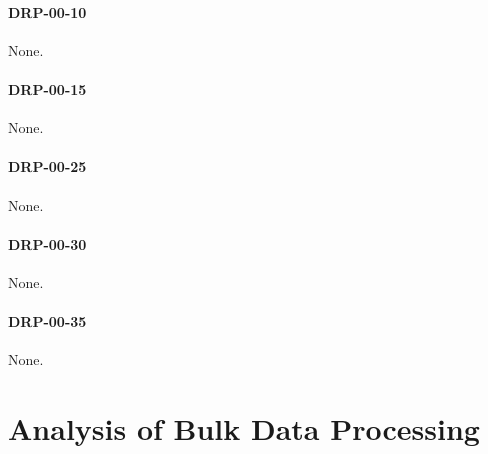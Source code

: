 \documentclass[DM,lsstdraft,STR,toc]{lsstdoc}
\begin{document}
\paragraph{DRP-00-10}

None.

\paragraph{DRP-00-15}

None.

\paragraph{DRP-00-25}

None.

\paragraph{DRP-00-30}

None.

\paragraph{DRP-00-35}

None.

\appendix

\newpage

\section{Analysis of Bulk Data Processing}




\end{document}
